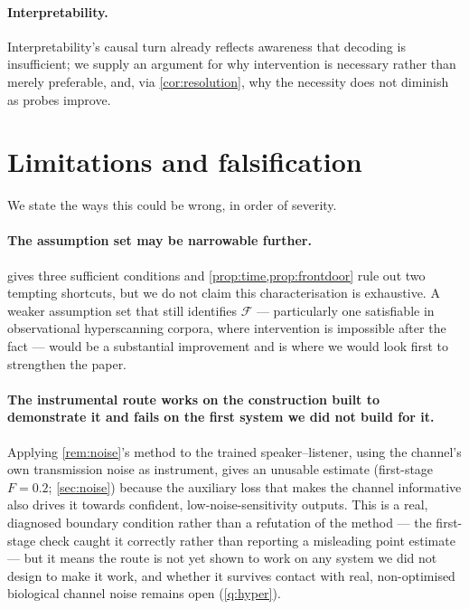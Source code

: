 \documentclass[11pt,a4paper]{article}
\theoremstyle{plain}
\theoremstyle{definition}
\theoremstyle{remark}
\newcommand{\Fc}{\mathcal{F}}
\begin{document}
\paragraph{Interpretability.}
Interpretability's causal turn \citep{geiger2021causal} already reflects awareness that decoding is
insufficient; we supply an argument for why intervention is necessary rather than merely preferable, and, via
\cref{cor:resolution}, why the necessity does not diminish as probes improve.

\section{Limitations and falsification}\label{sec:limits}

We state the ways this could be wrong, in order of severity.

\paragraph{The assumption set may be narrowable further.}
 gives three sufficient conditions and \cref{prop:time,prop:frontdoor} rule out two tempting
shortcuts, but we do not claim this characterisation is exhaustive. A weaker assumption set that still
identifies $\Fc$ --- particularly one satisfiable in observational hyperscanning corpora, where intervention is
impossible after the fact --- would be a substantial improvement and is where we would look first to
strengthen the paper.

\paragraph{The instrumental route works on the construction built to demonstrate it and fails on the first
system we did not build for it.}
Applying \cref{rem:noise}'s method to the trained speaker--listener, using the channel's own transmission noise
as instrument, gives an unusable estimate (first-stage $F = 0.2$; \cref{sec:noise}) because the auxiliary loss
that makes the channel informative also drives it towards confident, low-noise-sensitivity outputs. This is a
real, diagnosed boundary condition rather than a refutation of the method --- the first-stage check caught it
correctly rather than reporting a misleading point estimate --- but it means the route is not yet shown to work
on any system we did not design to make it work, and whether it survives contact with real, non-optimised
biological channel noise remains open (\cref{q:hyper}).
\end{document}
